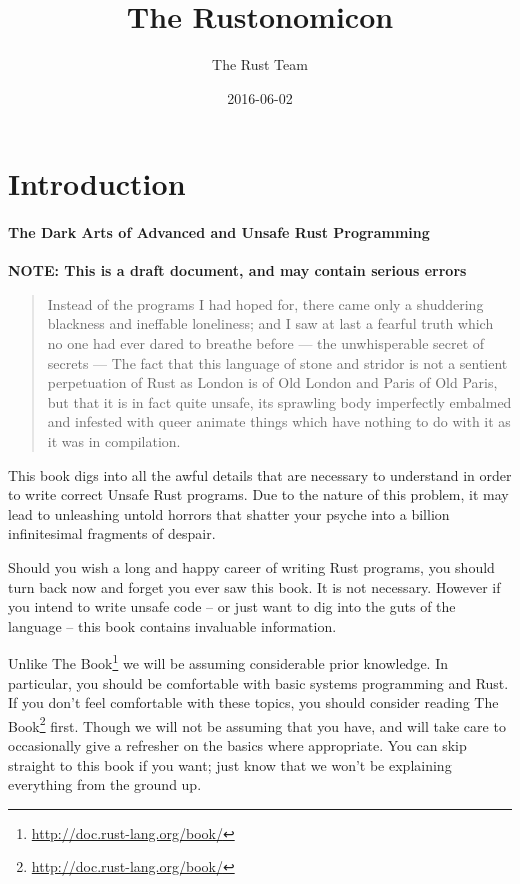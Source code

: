 \documentclass[a4paper,]{book}
\title{The Rustonomicon}
\author{The Rust Team}
\date{2016-06-02}
\renewcommand{\href}[2]{#2\footnote{\url{#1}}}
\begin{document}
  \maketitle



{
  \hypersetup{linkcolor=black}
  \setcounter{tocdepth}{2}
  \tableofcontents
  \newpage
}

\chapter{Introduction}\label{introduction}

\subsubsection{The Dark Arts of Advanced and Unsafe Rust
Programming}\label{the-dark-arts-of-advanced-and-unsafe-rust-programming}

\textbf{NOTE: This is a draft document, and may contain serious errors}

\begin{quote}
Instead of the programs I had hoped for, there came only a shuddering
blackness and ineffable loneliness; and I saw at last a fearful truth
which no one had ever dared to breathe before --- the unwhisperable
secret of secrets --- The fact that this language of stone and stridor
is not a sentient perpetuation of Rust as London is of Old London and
Paris of Old Paris, but that it is in fact quite unsafe, its sprawling
body imperfectly embalmed and infested with queer animate things which
have nothing to do with it as it was in compilation.
\end{quote}

This book digs into all the awful details that are necessary to
understand in order to write correct Unsafe Rust programs. Due to the
nature of this problem, it may lead to unleashing untold horrors that
shatter your psyche into a billion infinitesimal fragments of despair.

Should you wish a long and happy career of writing Rust programs, you
should turn back now and forget you ever saw this book. It is not
necessary. However if you intend to write unsafe code -- or just want to
dig into the guts of the language -- this book contains invaluable
information.

Unlike \href{http://doc.rust-lang.org/book/}{The Book} we will be
assuming considerable prior knowledge. In particular, you should be
comfortable with basic systems programming and Rust. If you don't feel
comfortable with these topics, you should consider
\href{http://doc.rust-lang.org/book/}{reading The Book} first. Though we
will not be assuming that you have, and will take care to occasionally
give a refresher on the basics where appropriate. You can skip straight
to this book if you want; just know that we won't be explaining
everything from the ground up.
\end{document}
